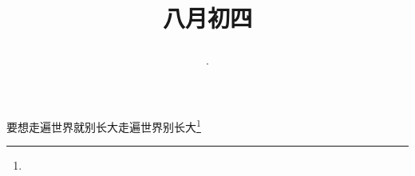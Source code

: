 \title{\date[d=6,m=9,y=2024][year:cn-y,年,month:cn,day:cn,日,·,weekday]·八月初四 }
要想走遍世界就别长大走遍世界别长大\footnote{ }

